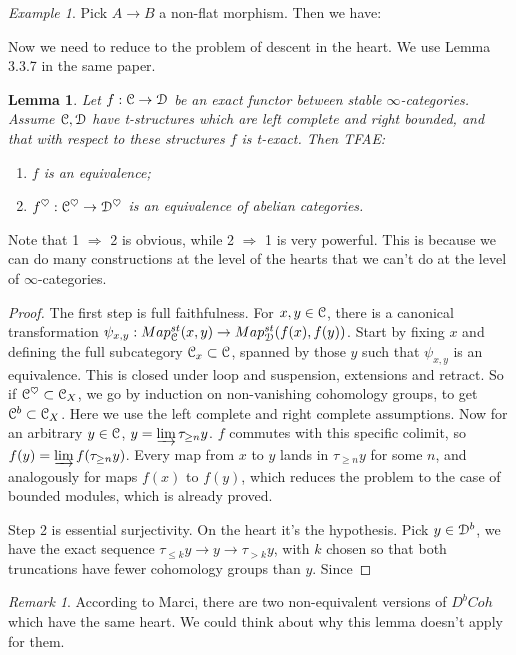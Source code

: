 \documentclass[10pt,a4paper,reqno,oneside]{book} %
\theoremstyle{plain}
\newtheorem{lem}[thm]{Lemma}
\theoremstyle{definition}
\theoremstyle{remark}
\newtheorem{eg}[thm]{Example}
\newtheorem{rem}[thm]{Remark}
\numberwithin{equation}{section}
\begin{document}
\begin{eg}
Pick $A \to B$ a non-flat morphism. Then we have: 
\end{eg}

Now we need to reduce to the problem of descent in the heart. We use Lemma 3.3.7 in the same paper.
\begin{lem}
\label{lem:equiv_heart}
Let $f : \mathcal C \to \mathcal D$ be an exact functor between stable $\infty$-categories. Assume $\mathcal C, \mathcal D$ have t-structures which
are left complete and right bounded, and that with respect to these structures $f$ is t-exact. Then TFAE:
\begin{enumerate}
\item $f$ is an equivalence;
\item $f^{\heartsuit} : \mathcal C^{\heartsuit} \to \mathcal D^{\heartsuit}$ is an equivalence of abelian categories.
\end{enumerate}
\end{lem}
Note that 1 $\Rightarrow$ 2 is obvious, while 2 $\Rightarrow$ 1 is very powerful. This is because we can do many constructions
at the level of the hearts that we can't do at the level of $\infty$-categories.

\begin{proof}
The first step is full faithfulness. For $x,y \in \mathcal C$, there is a canonical transformation $\psi_{x,y} :
Map_{\mathcal C}^{st}(x,y) \to Map_{\mathcal D}^{st}(f(x), f(y))$. Start by fixing $x$ and defining the full subcategory $\mathcal C_x \subset \mathcal C$,
spanned by those $y$ such that $\psi_{x,y}$ is an equivalence. This is closed under loop and suspension, extensions
and retract. So if $\mathcal C^{\heartsuit} \subset \mathcal C_X$, we go by induction on non-vanishing cohomology groups,
to get $\mathcal C^b \subset \mathcal C_X$. Here we use the left complete and right complete assumptions. Now for an arbitrary $y\in \mathcal C$,
$y = \varinjlim \tau_{\geq n} y$. $f$ commutes with this specific colimit, so $f(y) = \varinjlim f(\tau_{\geq n} y)$.
Every map from $x$ to $y$ lands in $\tau_{\geq n} y$ for some $n$, and analogously for maps $f(x)$ to $f(y)$, which reduces
the problem to the case of bounded modules, which is already proved.

Step 2 is essential surjectivity. On the heart it's the hypothesis. Pick $y\in \mathcal D^b$, we have the exact sequence
$\tau_{\leq k} y \to y \to \tau_{>k} y$, with $k$ chosen so that both truncations have fewer cohomology groups than $y$.
Since 
\end{proof}

\begin{rem}
According to Marci, there are two non-equivalent versions of $D^bCoh$ which have the same heart. We could think about why
this lemma doesn't apply for them.
\end{rem}
\end{document}
